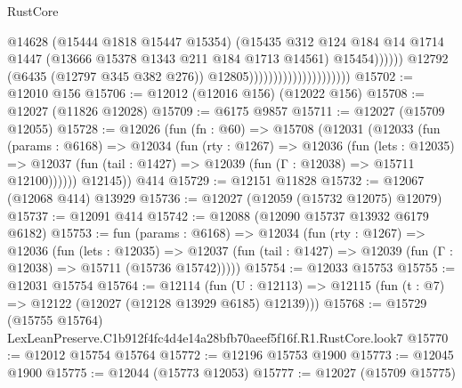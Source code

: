 \begin{lexlean}{RustCore}
\begin{coremodule}
                                                        @14628
                                                        (@15444 @1818 @15447 @15354)
                                                        (@15435
                                                          @312
                                                          @124
                                                          @184
                                                          @14
                                                          @1714
                                                          @1447
                                                          (@13666
                                                            @15378
                                                            @1343
                                                            @211
                                                            @184
                                                            @1713
                                                            @14561)
                                                          @15454))))))
                                              @12792
                                              (@6435 (@12797 @345 @382 @276))
                                              @12805)))))))))))))))))))))
@15702 := @12010 @156
@15706 := @12012 (@12016 @156) (@12022 @156)
@15708 := @12027 (@11826 @12028)
@15709 := @6175 @9857
@15711 := @12027 (@15709 @12055)
@15728 := @12026
    (fun (fn : @60) =>
    @15708
      (@12031
        (@12033
          (fun (params : @6168) =>
          @12034
            (fun (rty : @1267) =>
            @12036
              (fun (lets : @12035) =>
              @12037 (fun (tail : @1427) => @12039 (fun (Γ : @12038) => @15711 @12100))))))
        @12145))
    @414
@15729 := @12151 @11828
@15732 := @12067 (@12068 @414) @13929
@15736 := @12027 (@12059 (@15732 @12075) @12079)
@15737 := @12091 @414
@15742 := @12088 (@12090 @15737 @13932 @6179 @6182)
@15753 := fun (params : @6168) =>
  @12034
    (fun (rty : @1267) =>
    @12036
      (fun (lets : @12035) =>
      @12037 (fun (tail : @1427) => @12039 (fun (Γ : @12038) => @15711 (@15736 @15742)))))
@15754 := @12033 @15753
@15755 := @12031 @15754
@15764 := @12114
    (fun (U : @12113) => @12115 (fun (t : @7) => @12122 (@12027 (@12128 @13929 @6185) @12139)))
@15768 := @15729 (@15755 @15764) LexLeanPreserve.C1b912f4fc4d4e14a28bfb70aeef5f16f.R1.RustCore.look7
@15770 := @12012 @15754 @15764
@15772 := @12196 @15753 @1900
@15773 := @12045 @1900
@15775 := @12044 (@15773 @12053)
@15777 := @12027 (@15709 @15775)

\end{coremodule}
\end{lexlean}
